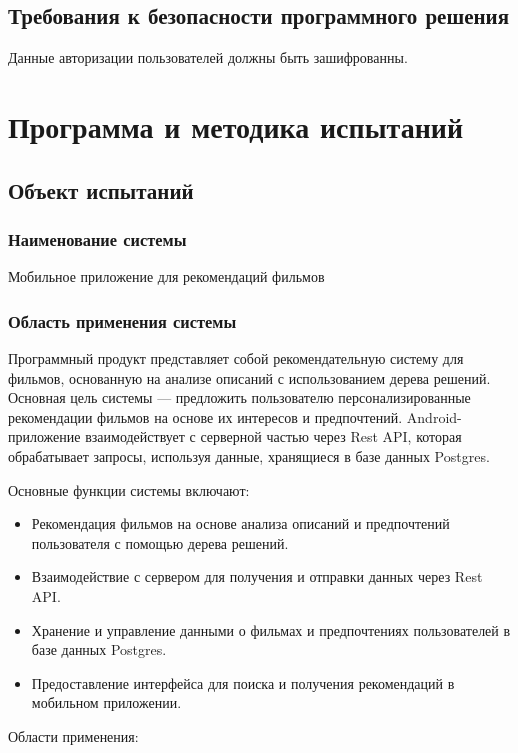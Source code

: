\subsection{Требования к безопасности программного решения}

Данные авторизации пользователей должны быть зашифрованны.

\section{Программа и методика испытаний}

\subsection{Объект испытаний}
\subsubsection{Наименование системы}

Мобильное приложение для рекомендаций фильмов

\subsubsection{Область применения системы}

Программный продукт представляет собой рекомендательную систему для фильмов, основанную на анализе описаний с использованием дерева решений. Основная цель системы — предложить пользователю персонализированные рекомендации фильмов на основе их интересов и предпочтений. Android-приложение взаимодействует с серверной частью через Rest API, которая обрабатывает запросы, используя данные, хранящиеся в базе данных Postgres.

Основные функции системы включают:

\begin{itemize}
	\item Рекомендация фильмов на основе анализа описаний и предпочтений пользователя с помощью дерева решений.
	\item Взаимодействие с сервером для получения и отправки данных через Rest API.
	\item Хранение и управление данными о фильмах и предпочтениях пользователей в базе данных Postgres.
	\item Предоставление интерфейса для поиска и получения рекомендаций в мобильном приложении.
\end{itemize}

Области применения:

